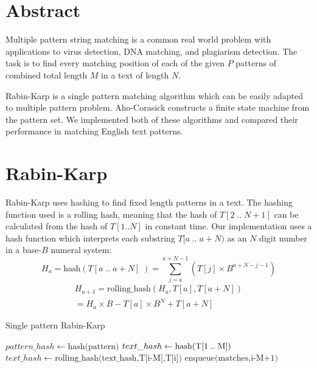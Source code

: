 \documentclass[final]{beamer}
\author{Aleksi Hartikainen and Jussi Kokkala}
\begin{document}
\begin{poster}

\newcolumn

\section{Abstract}
Multiple pattern string matching is a common real world problem with applications to virus detection, DNA matching, and plagiarism detection. The task is to find every matching position of each of the given $P$ patterns of combined total length $M$ in a text of length $N$.

Rabin-Karp is a single pattern matching algorithm which can be easily adapted to multiple pattern problem. Aho-Corasick constructs a finite state machine from the pattern set. We implemented both of these algorithms and compared their performance in matching English text patterns.

\section{Rabin-Karp}
      Rabin-Karp uses hashing to find fixed length patterns in a text. The hashing function used is a rolling hash, meaning that the hash of $T[2\;..\;N+1]$ can be calculated from the hash of $T[1..N]$ in constant time. Our implementation uses a hash function which interprets each substring $T[a\;..\;a+N)$ as an $N$ digit number in a base-$B$ numeral system:
\small
\begin{equation*}
H_a = \text{hash}(T[a\;..\;a+N]\;) = \sum_{j=a}^{a+N-1}(T[j] \times B^{a+N-j-1})
\end{equation*}
      \vspace{-4mm}
\begin{equation*}
\begin{multlined}
H_{a+1} = \text{rolling\_hash}(H_a, T[a], T[a+N])\\
= H_a \times B -  T[a] \times B^{N}  + T[a+N]
\end{multlined}
\end{equation*}
\normalsize
\vspace{10mm}
\begin{algorithm} [H]
\small
\caption{Single pattern Rabin-Karp}
\label{alg:rk_single}

\begin{algorithmic}[1]

\State $pattern\_hash \gets \text{hash(pattern)}$
\State $text\_hash \gets \text{hash(T[1\;..\;M])}$
        \State  $text\_hash \gets \text{rolling\_hash(text\_hash,T[i-M],T[i])}$
    \EndIf
            \State $\text{enqueue(matches,i-M+1)}$
        \EndIf
    \EndIf
\EndFor
\end{algorithmic}
\end{algorithm}


\end{poster}
\end{document}
